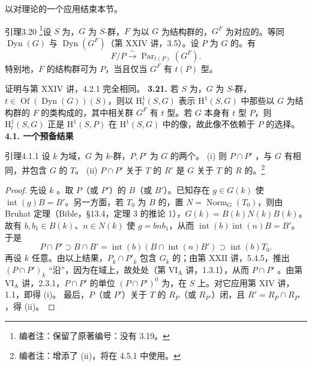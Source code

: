 以对理论的一个应用结束本节。
\begin{SGAresult}{引理}{3.20}
\footnote{编者注：保留了原著编号：没有 3.19。}设 $S$ 为，$G$ 为 $S$-群，$F$ 为以 $G$ 为结构群的，$G^F$ 为对应的。等同 $\operatorname{Dyn}(G)$ 与
$\operatorname{Dyn}(G^F)$（第 XXIV 讲，3.5）。设 $P$ 为 $G$ 的。有
\[F/P\xrightarrow{\sim}\operatorname{Par}_{t(P)}(G^F).\]
特别地，$F$ 的结构群可为 $P$，当且仅当 $G^F$ 有 $t(P)$ 型。
\end{SGAresult}
证明与第 XXIV 讲，4.2.1 完全相同。
\textbf{3.21.} 若 $S$ 为，$G$ 为 $S$-群，$t\in\operatorname{Of}(\operatorname{Dyn}(G))(S)$，则以 $\mathrm H^1_t(S,G)$ 表示 $\mathrm H^1(S,G)$ 中那些以 $G$ 为结构群的 $F$ 的类构成的，其中相关群 $G^F$ 有 $t$ 型。若 $G$ 本身有 $t$ 型 $P$，则 $\mathrm H^1_t(S,G)$ 正是 $\mathrm H^1(S,P)$ 在 $\mathrm H^1(S,G)$ 中的像，故此像不依赖于 $P$ 的选择。
\textbf{4.1. 一个预备结果}
\begin{SGAresult}{引理}{4.1.1}
设 $k$ 为域，$G$ 为 $k$-群，$P,P'$ 为 $G$ 的两个。
(i) 则 $P\cap P'$ ，与 $G$ 有相同，并包含 $G$ 的 $T$。
(ii) $P\cap P'$ 关于 $T$ 的 $R'$ 是 $G$ 关于 $T$ 的 $R$ 的。\footnote{编者注：增添了 (ii)，将在 4.5.1 中使用。}
\end{SGAresult}
\begin{proof}
先设 $k$ 。取 $P$（或 $P'$）的 $B$（或 $B'$）。已知存在 $g\in G(k)$ 使 $\operatorname{int}(g)B=B'$。另一方面，若 $T_0$ 为 $B$ 的，置 $N=\operatorname{Norm}_G(T_0)$，则由 Bruhat 定理（Bible，§13.4，定理 3 的推论 1），$G(k)=B(k)N(k)B(k)$。故有 $b,b_1\in B(k)$、$n\in N(k)$ 使 $g=bnb_1$，从而 $\operatorname{int}(b)\operatorname{int}(n)B=B'$。于是
\[P\cap P'\supset B\cap B'=\operatorname{int}(b)(B\cap\operatorname{int}(n)B')\supset\operatorname{int}(b)T_0.\]
再设 $k$ 任意。由以上结果，$P_{\bar k}\cap P'_{\bar k}$ 包含 $G_{\bar k}$ 的；由第 XXII 讲，5.4.5，推出 $(P\cap P')_{\bar k}$ “沿”，因为在域上，故处处（第 VI$_{\mathrm A}$ 讲，1.3.1），从而 $P\cap P'$ 。由第 VI$_{\mathrm A}$ 讲，2.3.1，$P\cap P'$ 的单位 $(P\cap P')^0$ 为，在 $S$ 上。对它应用第 XIV 讲，1.1，即得 (i)。
最后，$P$（或 $P'$）关于 $T$ 的 $R_P$（或 $R_{P'}$）闭，且 $R'=R_P\cap R_{P'}$，得 (ii)。
\end{proof}
